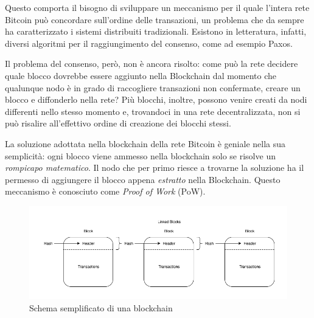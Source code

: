 Questo comporta il bisogno di sviluppare un meccanismo per il quale l'intera rete Bitcoin può concordare sull'ordine delle transazioni, un problema che da sempre ha caratterizzato i sistemi distribuiti tradizionali. Esistono in letteratura, infatti, diversi algoritmi per il raggiungimento del consenso, come ad esempio Paxos\cite{Lamport2001}.

Il problema del consenso, però, non è ancora risolto: come può la rete decidere quale blocco dovrebbe essere aggiunto nella Blockchain dal momento che qualunque nodo è in grado di raccogliere transazioni non confermate, creare un blocco e diffonderlo nella rete? Più blocchi, inoltre, possono venire creati da nodi differenti nello stesso momento e, trovandoci in una rete decentralizzata, non si può risalire all'effettivo ordine di creazione dei blocchi stessi.

La soluzione adottata nella blockchain della rete Bitcoin è geniale nella sua semplicità: ogni blocco viene ammesso nella blockchain solo se risolve un \textit{rompicapo matematico}. Il nodo che per primo riesce a trovarne la soluzione ha il permesso di aggiungere il blocco appena \textit{estratto} nella Blockchain. 
Questo meccanismo è conosciuto come \textit{Proof of Work} (PoW).

\begin{figure}[h!t]
\centerline{\includegraphics[scale=0.5]{img/blockchain}}
\caption{Schema semplificato di una blockchain}
\label{f:grids:arch}
\end{figure}

